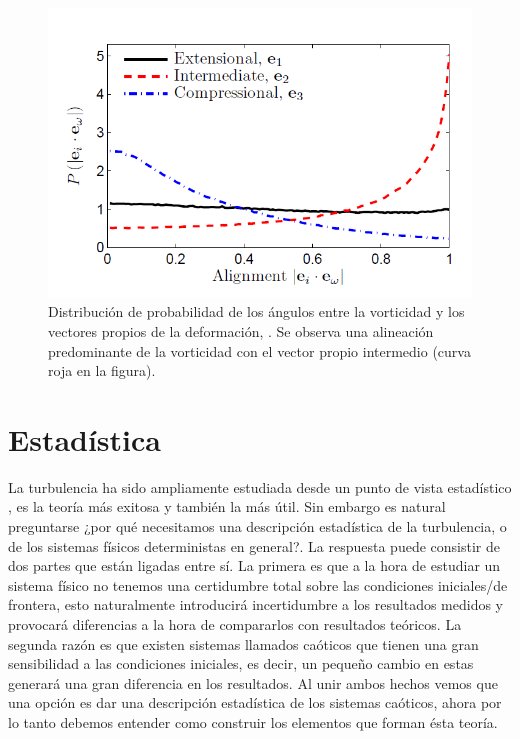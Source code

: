 \documentclass[executivepaper,12pt]{article}
\numberwithin{equation}{section}
\begin{document}
\begin{figure}[H]
	\begin{center}
		\includegraphics[scale=0.65]{strainAlignement}
	\end{center}
		\caption{Distribución de probabilidad de los ángulos entre la vorticidad y los vectores propios de la deformación,  \parencite{hamlington2008}. Se observa una alineación predominante de la vorticidad con el vector propio intermedio (curva roja en la figura).}
	\label{fig-align}
\end{figure}



\section{Estadística}

La turbulencia ha sido ampliamente estudiada desde un punto de vista estadístico \parencite{monin1976}, es la teoría más exitosa y también la más útil. Sin embargo es natural preguntarse ¿por qué necesitamos una descripción estadística de la turbulencia, o de los sistemas físicos deterministas en general?. La respuesta puede consistir de dos partes que están ligadas entre sí. La primera es que a la hora de estudiar un sistema físico no tenemos una certidumbre total sobre las condiciones iniciales/de frontera, esto naturalmente introducirá incertidumbre a los resultados medidos y provocará diferencias a la hora de compararlos con resultados teóricos. La segunda razón es que existen sistemas llamados caóticos que tienen una gran sensibilidad a las condiciones iniciales, es decir, un pequeño cambio en estas generará una gran diferencia en los resultados. Al unir ambos hechos vemos que una opción es dar una descripción estadística de los sistemas caóticos, ahora por lo tanto debemos entender como construir los elementos que forman ésta teoría.\\
\end{document}
